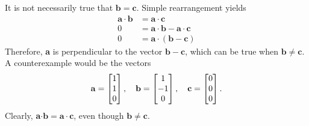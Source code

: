 \item
It is not necessarily true that $\mathbf{b}=\mathbf{c}$. Simple rearrangement yields
\begin{align*}
\mathbf{a}\cdot\mathbf{b}&=\mathbf{a}\cdot\mathbf{c} \\
0 &=\mathbf{a}\cdot\mathbf{b} - \mathbf{a}\cdot\mathbf{c} \\
0 &=\mathbf{a}\cdot (\mathbf{b} - \mathbf{c})
\end{align*}
Therefore, \textbf{a} is perpendicular to the vector $\mathbf{b} - \mathbf{c}$, which can be true when $\mathbf{b} \ne \mathbf{c}$.  A counterexample would be the vectors
\begin{align*}
\mathbf{a} = \begin{bmatrix} 1 \\ 1 \\ 0 \end{bmatrix} ,  \quad \mathbf{b} = \begin{bmatrix} 1 \\ -1 \\ 0 \end{bmatrix} , \quad  \mathbf{c} = \begin{bmatrix} 0 \\ 0 \\ 0 \end{bmatrix} .
\end{align*}
Clearly, \textbf{a}$\cdot\mathbf{b}=\mathbf{a}\cdot\mathbf{c}$, even though $\mathbf{b} \ne \mathbf{c}$.  
%
